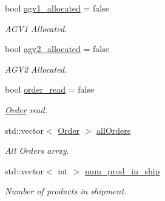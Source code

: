 \begin{DoxyCompactItemize}
\item 
\mbox{\label{classBuildClass_a4e780c195a7ef83b8a6d1b3561c30df9}} 
bool \hyperlink{classBuildClass_a4e780c195a7ef83b8a6d1b3561c30df9}{agv1\+\_\+allocated} = false
\begin{DoxyCompactList}\small\item\em A\+G\+V1 Allocated. \end{DoxyCompactList}\item 
\mbox{\label{classBuildClass_a2b9d524dd2f0409a722b60c039cda87f}} 
bool \hyperlink{classBuildClass_a2b9d524dd2f0409a722b60c039cda87f}{agv2\+\_\+allocated} = false
\begin{DoxyCompactList}\small\item\em A\+G\+V2 Allocated. \end{DoxyCompactList}\item 
\mbox{\label{classBuildClass_a5972aaddc18c4eeb901d6712abced0ad}} 
bool \hyperlink{classBuildClass_a5972aaddc18c4eeb901d6712abced0ad}{order\+\_\+read} = false
\begin{DoxyCompactList}\small\item\em \hyperlink{structOrder}{Order} read. \end{DoxyCompactList}\item 
\mbox{\label{classBuildClass_a54649e5a5dd731a0c11660d7f243033a}} 
std\+::vector$<$ \hyperlink{structOrder}{Order} $>$ \hyperlink{classBuildClass_a54649e5a5dd731a0c11660d7f243033a}{all\+Orders}
\begin{DoxyCompactList}\small\item\em All Orders array. \end{DoxyCompactList}\item 
\mbox{\label{classBuildClass_ae03a5f1252946a467364d6424f604b75}} 
std\+::vector$<$ int $>$ \hyperlink{classBuildClass_ae03a5f1252946a467364d6424f604b75}{num\+\_\+prod\+\_\+in\+\_\+ship}
\begin{DoxyCompactList}\small\item\em Number of products in shipment. \end{DoxyCompactList}\item 
\mbox{\label{classBuildClass_a46932efd4c8b2b97d0624a6117b40ee0}} 

\end{DoxyCompactItemize}
